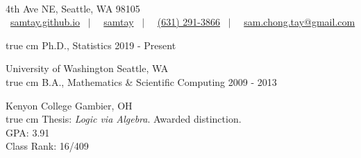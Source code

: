 \documentclass[11pt,article,oneside]{memoir}
\makeatletter
\def\myemail{sam.chong.tay@gmail.com}
\def\myweb{https://samtay.github.io}
\def\myphone{(631) 291-3866}
\def\mygithub{samtay}
\makeatother
\begin{document}
\renewcommand{\labelitemi}{~}

\def\ind{\hangindent=1 true cm\hangafter=1 \noindent}
\def\labelitemi{~}
\renewcommand{\labelitemii}{~}


\pagestyle{kjh}


\begin{center}
 \\
\vspace{.6em}

\footnotesize
   4th Ave NE, Seattle, \textsc{WA} 98105 \\
  \vspace{.3em}
  \faGlobe \, \href{\myweb}{samtay.github.io}
  $\enspace | \enspace$
  \faGithub \, \href{https://github.com/samtay}{\mygithub}
  $\enspace | \enspace$
  \faPhone \, \href{tel:\myphone}{\myphone}
  $\enspace | \enspace$
  \faEnvelope \, \href{mailto:\myemail}{\myemail}
\normalsize
\end{center}

\bigskip

\reversemarginpar


\ind Ph.D., Statistics \hfill 2019 - Present

\noindent University of Washington \hfill Seattle, WA \\

\ind B.A., Mathematics \& Scientific Computing \hfill 2009 - 2013

\noindent Kenyon College \hfill Gambier, OH \\
\ind \footnotesize
  Thesis: \emph{Logic via Algebra}. Awarded distinction. \\
  GPA: 3.91 \\
  Class Rank: 16/409
\normalsize
\vspace{0.05in}
\end{document}
